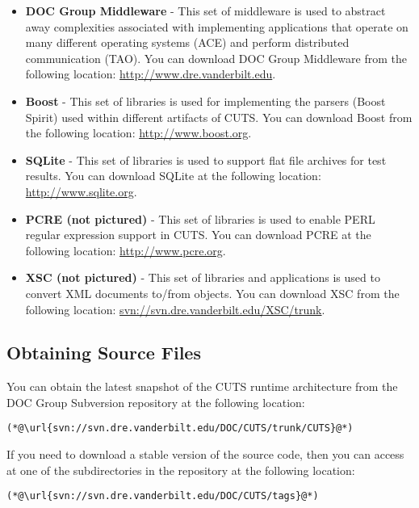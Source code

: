 \begin{itemize} 
  \item \textbf{DOC Group Middleware} - This set of middleware is used to abstract 
  away complexities associated with implementing applications that operate on many 
  different operating systems (ACE) and perform distributed communication (TAO). 
  You can download DOC Group Middleware from the following location: 
  \url{http://www.dre.vanderbilt.edu}.

  \item \textbf{Boost} - This set of libraries is used for implementing the parsers 
  (Boost Spirit) used within different artifacts of CUTS. You can download Boost from
  the following location: \url{http://www.boost.org}.

  \item \textbf{SQLite} - This set of libraries is used to support flat file archives
  for test results. You can download SQLite at the following location: 
  \url{http://www.sqlite.org}.

  \item \textbf{PCRE (not pictured)} - This set of libraries is used to enable PERL 
  regular expression support in CUTS. You can download PCRE at the following location:
  \url{http://www.pcre.org}.

  \item \textbf{XSC (not pictured)} - This set of libraries and applications is used to 
  convert XML documents to/from objects. You can download XSC from the following location: 
  \url{svn://svn.dre.vanderbilt.edu/XSC/trunk}.
\end{itemize}

\subsection{Obtaining Source Files}
\label{sec:install-download-runtime}

You can obtain the latest snapshot of the CUTS runtime architecture from the
DOC Group Subversion repository at the following location:
\begin{lstlisting}
(*@\url{svn://svn.dre.vanderbilt.edu/DOC/CUTS/trunk/CUTS}@*)
\end{lstlisting}
If you need to download a stable version of the source code, then you can 
access at one of the subdirectories in the repository at the following location:
\begin{lstlisting}
(*@\url{svn://svn.dre.vanderbilt.edu/DOC/CUTS/tags}@*)
\end{lstlisting}

